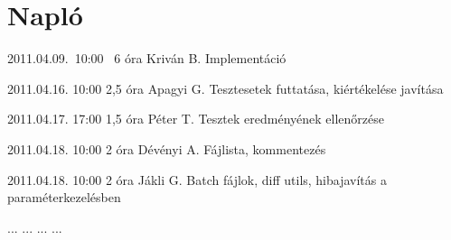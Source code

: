 %
\section{Napló}

\begin{naplo}

\bejegyzes
{2011.04.09.~10:00~} %
{6 óra} %
{Kriván B.} %
{Implementáció} %

\bejegyzes
{2011.04.16. 10:00} %
{2,5 óra} %
{Apagyi G.} %
{Tesztesetek futtatása, kiértékelése javítása} %

\bejegyzes
{2011.04.17. 17:00} %
{1,5 óra} %
{Péter T.} %
{Tesztek eredményének ellenőrzése} %

\bejegyzes
{2011.04.18. 10:00} %
{2 óra} %
{Dévényi A.} %
{Fájlista, kommentezés} %

\bejegyzes
{2011.04.18. 10:00} %
{2 óra} %
{Jákli G.} %
{Batch fájlok, diff utils, hibajavítás a paraméterkezelésben} %

\bejegyzes
{...}
{...}
{...}
{...}


\end{naplo}

